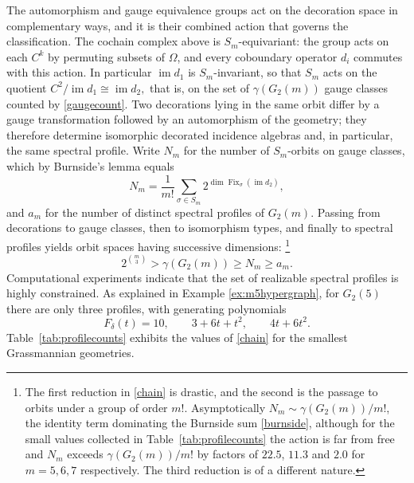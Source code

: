 \documentclass[times,11pt,reqno]{amsproc}
\theoremstyle{definition}
\numberwithin{equation}{section}
\begin{document}
The automorphism and gauge equivalence groups act on the decoration space in complementary ways, and it
is their combined action that governs the classification. The cochain
complex above is $S_m$-equivariant: the group acts on each $C^k$ by
permuting subsets of $\Omega$, and every coboundary operator $d_i$
commutes with this action. In particular $\operatorname{im}d_1$ is
$S_m$-invariant, so that $S_m$ acts on the quotient
$
C^2/\operatorname{im}d_1
\cong
\operatorname{im}d_2,
$
that is, on the set of $\gamma(G_2(m))$ gauge classes counted by
\eqref{gaugecount}. Two decorations lying in the same orbit differ by a
gauge transformation followed by an automorphism of the geometry; they
therefore determine isomorphic decorated incidence algebras and, in
particular, the same spectral profile. Write $N_m$ for the number of
$S_m$-orbits on gauge classes, which by Burnside's lemma equals
\begin{equation}\label{burnside}
N_m
=
\frac1{m!}
\sum_{\sigma\in S_m}
2^{\dim\operatorname{Fix}_\sigma(\operatorname{im}d_2)},
\end{equation}
and $a_m$ for the number of distinct spectral profiles of $G_2(m)$. Passing from decorations to gauge classes, then to isomorphism types, and
finally to spectral profiles yields orbit spaces having successive dimensions:
\footnote{The first reduction in \eqref{chain} is drastic, and the second is the
passage to orbits under a group of order $m!$. Asymptotically
$N_m\sim\gamma(G_2(m))/m!$, the identity term dominating the Burnside sum
\eqref{burnside}, although for the small values collected in
Table~\ref{tab:profilecounts} the action is far from free and $N_m$
exceeds $\gamma(G_2(m))/m!$ by factors of $22.5$, $11.3$ and $2.0$ for
$m=5,6,7$ respectively. The third reduction is of a different nature.}
\begin{equation}\label{chain}
2^{\binom m3}
>
\gamma(G_2(m))
\ge N_m
\ge a_m.
\end{equation}
Computational experiments indicate that the set of realizable spectral
profiles is highly constrained. As explained in Example \ref{ex:m5hypergraph}, for $G_2(5)$ there are only three
profiles, with generating polynomials
$$
F_\delta(t)
=
10,
\qquad
3+6t+t^2,
\qquad
4t+6t^2.
$$
Table~\ref{tab:profilecounts} exhibits the values of
\eqref{chain} for the smallest Grassmannian geometries.
\end{document}
